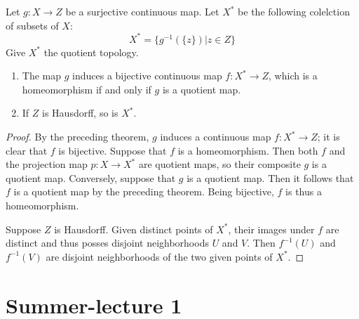 \documentclass[12pt, a4paper, oneside, openright, titlepage]{book}
\begin{document}
\begin{cor}
    Let $g:X\rightarrow Z$ be a surjective continuous map. Let $X^*$ be the following colelction of subsets of $X$: \begin{equation*}
        X^* = \{g^{-1}(\{z\})\vert z \in Z\}
    \end{equation*}
    Give $X^*$ the quotient topology. \begin{enumerate}
        \item The map $g$ induces a bijective continuous map $f:X^*\rightarrow Z$, which is a homeomorphism if and only if $g$ is a quotient map.
            \begin{center}
            \end{center}
            \item If $Z$ is Hausdorff, so is $X^*$.
    \end{enumerate}
\end{cor}
\begin{proof}
    By the preceding theorem, $g$ induces a continuous map $f:X^*\rightarrow Z$; it is clear that $f$ is bijective. Suppose that $f$ is a homeomorphism. Then both $f$ and the projection map $p:X\rightarrow X^*$ are quotient maps, so their composite $g$ is a quotient map. Conversely, suppose that $g$ is a quotient map. Then it follows that $f$ is a quotient map by the preceding theorem. Being bijective, $f$ is thus a homeomorphism.

    Suppose $Z$ is Hausdorff. Given distinct points of $X^*$, their images under $f$ are distinct and thus posses disjoint neighborhoods $U$ and $V$. Then $f^{-1}(U)$ and $f^{-1}(V)$ are disjoint neighborhoods of the two given points of $X^*$.
\end{proof}




\section{Summer-lecture 1}
\end{document}
